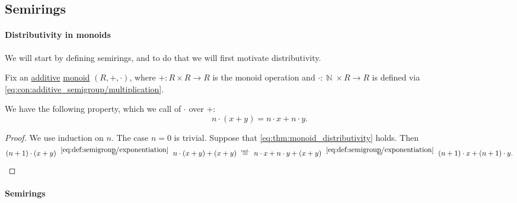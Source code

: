 \subsection{Semirings}\label{subsec:semirings}

\paragraph{Distributivity in monoids}

We will start by defining semirings, and to do that we will first motivate distributivity.

\begin{proposition}\label{thm:monoid_distributivity}
  Fix an \hyperref[con:additive_semigroup/multiplication]{additive} \hyperref[def:monoid]{monoid} \( (R, +, \cdot) \), where \( +: R \times R \to R \) is the monoid operation and \( \cdot: \BbbN \times R \to R \) is defined via \eqref{eq:con:additive_semigroup/multiplication}.

  We have the following property, which we call  of \( \cdot \) over \( + \):
  \begin{equation}\label{eq:thm:monoid_distributivity}
    n \cdot (x + y) = n \cdot x + n \cdot y.
  \end{equation}
\end{proposition}
\begin{proof}
  We use induction on \( n \). The case \( n = 0 \) is trivial. Suppose that \eqref{eq:thm:monoid_distributivity} holds. Then
  \begin{equation*}
    (n + 1) \cdot (x + y)
    \reloset {\eqref{eq:def:semigroup/exponentiation}} =
    n \cdot (x + y) + (x + y)
    \reloset {\T{ind.}} =
    n \cdot x + n \cdot y + (x + y)
    \reloset {\eqref{eq:def:semigroup/exponentiation}} =
    (n + 1) \cdot x + (n + 1) \cdot y.
  \end{equation*}
\end{proof}

\paragraph{Semirings}

